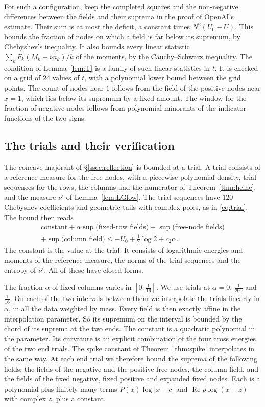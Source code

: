 For such a configuration, keep the completed squares and the non-negative differences between the fields and
their suprema in the proof of OpenAI's estimate. Their sum is at most the deficit, a constant times $N^2(U_0-U)$.
This bounds the fraction of nodes on which a field is far below its supremum, by Chebyshev's inequality. It
also bounds every linear statistic $\sum_kF_k(M_k-\nu a_k)/k$ of the moments, by the Cauchy--Schwarz
inequality. The condition of Lemma~\ref{lem:T} is a family of such linear statistics in $t$. It is checked on a
grid of $24$ values of $t$, with a polynomial lower bound between the grid points. The count of nodes near $1$
follows from the field of the positive nodes near $x=1$, which lies below its supremum by a fixed amount. The
window for the fraction of negative nodes follows from polynomial minorants of the indicator functions of the
two signs.

\subsection{The trials and their verification}\label{ssec:signedcert}
The concave majorant of \S\ref{ssec:reflection} is bounded at a trial. A trial consists of a reference measure
for the free nodes, with a piecewise polynomial density, trial sequences for the rows, the columns and the
numerator of Theorem~\ref{thm:heine}, and the measure $\nu'$ of Lemma~\ref{lem:LGlow}. The trial sequences
have $120$ Chebyshev coefficients and geometric tails with complex poles, as in \eqref{eq:trial}. The bound
then reads
\begin{multline*}
 \text{constant}+\alpha\sup\text{(fixed-row fields)}+\sup\text{(free-node fields)}\\
 +\sup\text{(column field)}\le-U_0+\tfrac12\log2+c_2\alpha .
\end{multline*}
The constant is the value at the trial. It consists of logarithmic energies and moments of the reference
measure, the norms of the trial sequences and the entropy of $\nu'$. All of these have closed forms.

The fraction $\alpha$ of fixed columns varies in $[0,\frac1{16}]$. We use trials at $\alpha=0$, $\frac1{200}$ and
$\frac1{16}$. On each of the two intervals between them we interpolate the trials linearly in $\alpha$, in all
the data weighted by mass. Every field is then exactly affine in the interpolation parameter. So its supremum
on the interval is bounded by the chord of its suprema at the two ends. The constant is a quadratic polynomial
in the parameter. Its curvature is an explicit combination of the four cross energies of the two end trials.
The spike constant of Theorem~\ref{thm:spike} interpolates in the same way. At each end trial we therefore
bound the suprema of the following fields: the fields of the negative and the positive free nodes, the
column field, and the fields of the fixed negative, fixed positive and expanded fixed nodes. Each is a
polynomial plus finitely many terms $P(x)\log|x-c|$ and $\operatorname{Re}\rho\log(x-z)$ with complex $z$, plus
a constant.

